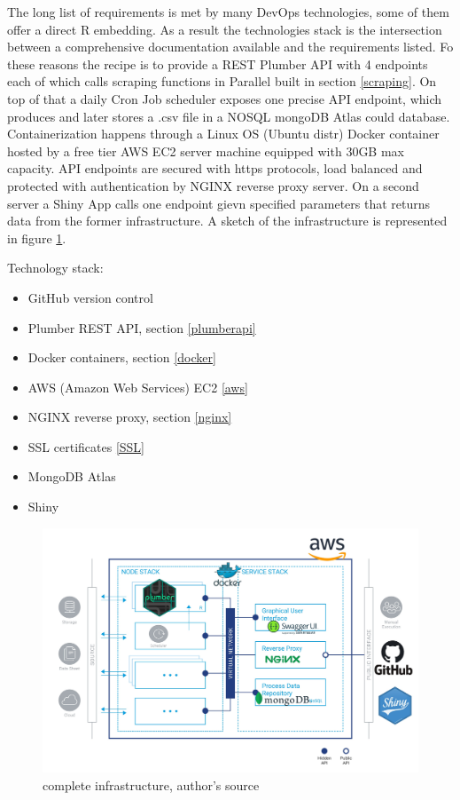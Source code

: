 \documentclass[
  12pt,
  a4paper,
  oneside]{book}
\providecommand{\tightlist}{%
  \setlength{\itemsep}{0pt}\setlength{\parskip}{0pt}}
\theoremstyle{definition}
\theoremstyle{definition}
\theoremstyle{definition}
\theoremstyle{remark}
\begin{document}
The long list of requirements is met by many DevOps technologies, some of them offer a direct R embedding. As a result the technologies stack is the intersection between a comprehensive documentation available and the requirements listed.
Fo these reasons the recipe is to provide a REST Plumber API with 4 endpoints each of which calls scraping functions in Parallel built in section \ref{scraping}. On top of that a daily Cron Job scheduler exposes one precise API endpoint, which produces and later stores a .csv file in a NOSQL mongoDB Atlas could database. Containerization happens through a Linux OS (Ubuntu distr) Docker container hosted by a free tier AWS EC2 server machine equipped with 30GB max capacity. API endpoints are secured with https protocols, load balanced and protected with authentication by NGINX reverse proxy server. On a second server a Shiny App calls one endpoint gievn specified parameters that returns data from the former infrastructure. A sketch of the infrastructure is represented in figure \ref{fig:CompleteStructure}.

Technology stack:

\begin{itemize}
\tightlist
\item
  GitHub version control
\item
  Plumber REST API, section \ref{plumberapi}
\item
  Docker containers, section \ref{docker}
\item
  AWS (Amazon Web Services) EC2 \ref{aws}
\item
  NGINX reverse proxy, section \ref{nginx}
\item
  SSL certificates \ref{SSL}
\item
  MongoDB Atlas
\item
  Shiny
\end{itemize}

\begin{figure}
\centering
\includegraphics{images/tot_infra.jpg}
\caption{\label{fig:CompleteStructure}complete infrastructure, author's source}
\end{figure}
\end{document}
